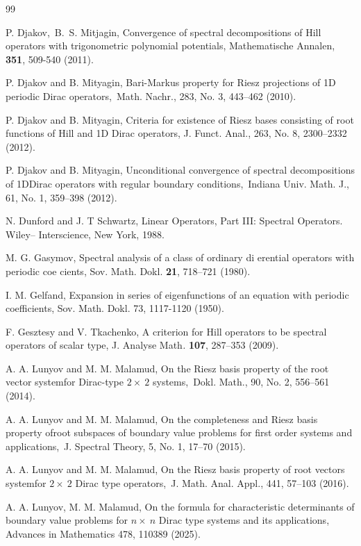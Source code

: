 \documentclass{article}%
\begin{document}
\begin{thebibliography}{99}                                                                                               %


\bibitem {}P. Djakov,~B.~S. Mitjagin, Convergence of spectral decompositions
of Hill operators with trigonometric polynomial potentials, Mathematische
Annalen, \textbf{351}, 509-540 (2011).

\bibitem {}P. Djakov and B. Mityagin, Bari-Markus property for Riesz
projections of 1D periodic Dirac operators,\ Math. Nachr., 283, No. 3,
443--462 (2010).

\bibitem {}P. Djakov and B. Mityagin, Criteria for existence of Riesz bases
consisting of root functions of Hill and 1D Dirac operators, J. Funct. Anal.,
263, No. 8, 2300--2332 (2012).

\bibitem {}P. Djakov and B. Mityagin, Unconditional convergence of spectral
decompositions of 1DDirac operators with regular boundary conditions,\ Indiana
Univ. Math. J., 61, No. 1, 359--398 (2012).

\bibitem {}N. Dunford and J. T Schwartz, Linear Operators, Part III: Spectral
Operators. Wiley-- Interscience, New York, 1988.

\bibitem {}M. G. Gasymov, Spectral analysis of a class of ordinary di erential
operators with periodic coe cients, Sov. Math. Dokl. \textbf{21}, 718--721 (1980).

\bibitem {}I. M. Gelfand, Expansion in series of eigenfunctions of an equation
with periodic coefficients, Sov. Math. Dokl. {73}, 1117-1120 (1950).

\bibitem {}F. Gesztesy and V. Tkachenko, A criterion for Hill operators to be
spectral operators of scalar type, J. Analyse Math\textit{.} \textbf{107},
287--353 (2009).

\bibitem {}A. A. Lunyov and M. M. Malamud, On the Riesz basis property of the
root vector systemfor Dirac-type $2\times\ 2$ systems,\ Dokl. Math., 90, No.
2, 556--561 (2014).

\bibitem {}A. A. Lunyov and M. M. Malamud, On the completeness and Riesz basis
property ofroot subspaces of boundary value problems for first order systems
and applications,\ J. Spectral Theory, 5, No. 1, 17--70 (2015).

\bibitem {}A. A. Lunyov and M. M. Malamud, On the Riesz basis property of root
vectors systemfor $2\times\ 2$ Dirac type operators,\ J. Math. Anal. Appl.,
441, 57--103 (2016).

\bibitem {}A. A. Lunyov, M. M. Malamud, On the formula for characteristic
determinants of boundary value problems for $n\times\ n$ Dirac type systems
and its applications, Advances in Mathematics 478, 110389 (2025).


\end{thebibliography}
\end{document}
